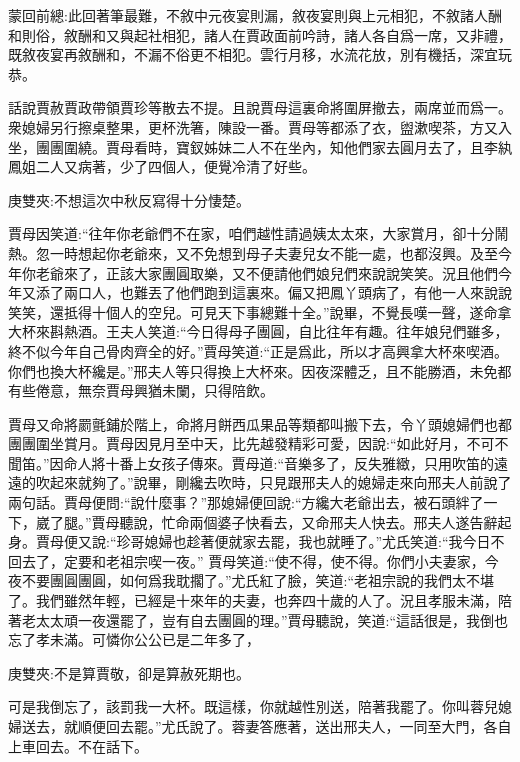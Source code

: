 
\begin{parag}
    \begin{note}蒙回前總:此回著筆最難，不敘中元夜宴則漏，敘夜宴則與上元相犯，不敘諸人酬和則俗，敘酬和又與起社相犯，諸人在賈政面前吟詩，諸人各自爲一席，又非禮，既敘夜宴再敘酬和，不漏不俗更不相犯。雲行月移，水流花放，別有機括，深宜玩恭。\end{note}
\end{parag}


\begin{parag}
    話說賈赦賈政帶領賈珍等散去不提。且說賈母這裏命將圍屏撤去，兩席並而爲一。衆媳婦另行擦桌整果，更杯洗箸，陳設一番。賈母等都添了衣，盥漱喫茶，方又入坐，團團圍繞。賈母看時，寶釵姊妹二人不在坐內，知他們家去圓月去了，且李紈鳳姐二人又病著，少了四個人，便覺冷清了好些。\begin{note}庚雙夾:不想這次中秋反寫得十分悽楚。\end{note}賈母因笑道:“往年你老爺們不在家，咱們越性請過姨太太來，大家賞月，卻十分鬧熱。忽一時想起你老爺來，又不免想到母子夫妻兒女不能一處，也都沒興。及至今年你老爺來了，正該大家團圓取樂，又不便請他們娘兒們來說說笑笑。況且他們今年又添了兩口人，也難丟了他們跑到這裏來。偏又把鳳丫頭病了，有他一人來說說笑笑，還抵得十個人的空兒。可見天下事總難十全。”說畢，不覺長嘆一聲，遂命拿大杯來斟熱酒。王夫人笑道:“今日得母子團圓，自比往年有趣。往年娘兒們雖多，終不似今年自己骨肉齊全的好。”賈母笑道:“正是爲此，所以才高興拿大杯來喫酒。你們也換大杯纔是。”邢夫人等只得換上大杯來。因夜深體乏，且不能勝酒，未免都有些倦意，無奈賈母興猶未闌，只得陪飲。
\end{parag}


\begin{parag}
    賈母又命將罽氈鋪於階上，命將月餅西瓜果品等類都叫搬下去，令丫頭媳婦們也都團團圍坐賞月。賈母因見月至中天，比先越發精彩可愛，因說:“如此好月，不可不聞笛。”因命人將十番上女孩子傳來。賈母道:“音樂多了，反失雅緻，只用吹笛的遠遠的吹起來就夠了。”說畢，剛纔去吹時，只見跟邢夫人的媳婦走來向邢夫人前說了兩句話。賈母便問:“說什麼事？”那媳婦便回說:“方纔大老爺出去，被石頭絆了一下，崴了腿。”賈母聽說，忙命兩個婆子快看去，又命邢夫人快去。邢夫人遂告辭起身。賈母便又說:“珍哥媳婦也趁著便就家去罷，我也就睡了。”尤氏笑道:“我今日不回去了，定要和老祖宗喫一夜。” 賈母笑道:“使不得，使不得。你們小夫妻家，今夜不要團圓團圓，如何爲我耽擱了。”尤氏紅了臉，笑道:“老祖宗說的我們太不堪了。我們雖然年輕，已經是十來年的夫妻，也奔四十歲的人了。況且孝服未滿，陪著老太太頑一夜還罷了，豈有自去團圓的理。”賈母聽說，笑道:“這話很是，我倒也忘了孝未滿。可憐你公公已是二年多了，\begin{note}庚雙夾:不是算賈敬，卻是算赦死期也。\end{note}可是我倒忘了，該罰我一大杯。既這樣，你就越性別送，陪著我罷了。你叫蓉兒媳婦送去，就順便回去罷。”尤氏說了。蓉妻答應著，送出邢夫人，一同至大門，各自上車回去。不在話下。
\end{parag}


